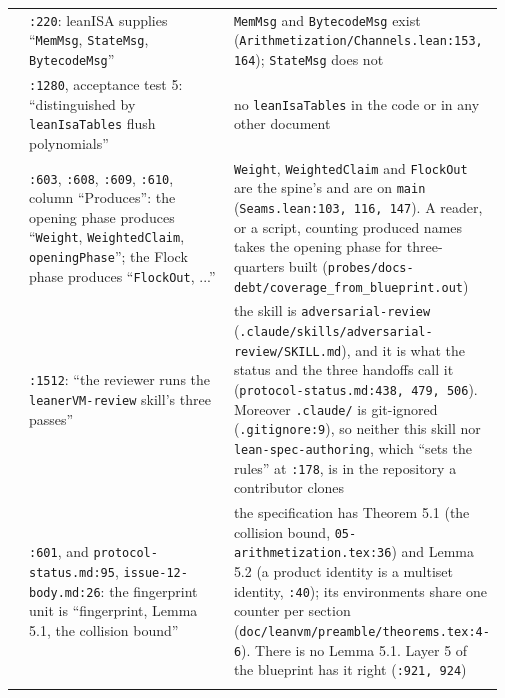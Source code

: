 {\begin{longtable}{@{}>{\raggedright\arraybackslash}p{0.029\linewidth}>{\raggedright\arraybackslash}p{0.470\linewidth}>{\raggedright\arraybackslash}p{0.470\linewidth}@{}}
4 & \texttt{:\allowbreak{}220}: leanISA supplies ``\texttt{MemMsg}, \texttt{StateMsg}, \texttt{BytecodeMsg}'' & \texttt{MemMsg} and \texttt{BytecodeMsg} exist (\texttt{Arithmetization/\allowbreak{}Channels.\allowbreak{}lean:\allowbreak{}153,\allowbreak{} 164}); \texttt{StateMsg} does not \\\addlinespace[2pt]
5 & \texttt{:\allowbreak{}1280}, acceptance test 5: ``distinguished by \texttt{leanIsaTables} flush polynomials'' & no \texttt{leanIsaTables} in the code or in any other document \\\addlinespace[2pt]
6 & \texttt{:\allowbreak{}603}, \texttt{:\allowbreak{}608}, \texttt{:\allowbreak{}609}, \texttt{:\allowbreak{}610}, column ``Produces'': the opening phase produces ``\texttt{Weight}, \texttt{WeightedClaim}, \texttt{openingPhase}''; the Flock phase produces ``\texttt{FlockOut}, ...'' & \texttt{Weight}, \texttt{WeightedClaim} and \texttt{FlockOut} are the spine's and are on \texttt{main} (\texttt{Seams.\allowbreak{}lean:\allowbreak{}103,\allowbreak{} 116,\allowbreak{} 147}). A reader, or a script, counting produced names takes the opening phase for three-quarters built (\texttt{probes/\allowbreak{}docs-\allowbreak{}debt/\allowbreak{}coverage\_\allowbreak{}from\_\allowbreak{}blueprint.\allowbreak{}out}) \\\addlinespace[2pt]
7 & \texttt{:\allowbreak{}1512}: ``the reviewer runs the \texttt{leaner\allowbreak{}VM-\allowbreak{}review} skill's three passes'' & the skill is \texttt{adversarial-\allowbreak{}review} (\texttt{.\allowbreak{}claude/\allowbreak{}skills/\allowbreak{}adversarial-\allowbreak{}review/\allowbreak{}SKILL.\allowbreak{}md}), and it is what the status and the three handoffs call it (\texttt{protocol-\allowbreak{}status.\allowbreak{}md:\allowbreak{}438,\allowbreak{} 479,\allowbreak{} 506}). Moreover \texttt{.\allowbreak{}claude/\allowbreak{}} is git-ignored (\texttt{.\allowbreak{}gitignore:\allowbreak{}9}), so neither this skill nor \texttt{lean-\allowbreak{}spec-\allowbreak{}authoring}, which ``sets the rules'' at \texttt{:\allowbreak{}178}, is in the repository a contributor clones \\\addlinespace[2pt]
8 & \texttt{:\allowbreak{}601}, and \texttt{protocol-\allowbreak{}status.\allowbreak{}md:\allowbreak{}95}, \texttt{issue-\allowbreak{}12-\allowbreak{}body.\allowbreak{}md:\allowbreak{}26}: the fingerprint unit is ``fingerprint, Lemma 5.1, the collision bound'' & the specification has Theorem 5.1 (the collision bound, \texttt{05-\allowbreak{}arithmetization.\allowbreak{}tex:\allowbreak{}36}) and Lemma 5.2 (a product identity is a multiset identity, \texttt{:\allowbreak{}40}); its environments share one counter per section (\texttt{doc/\allowbreak{}leanvm/\allowbreak{}preamble/\allowbreak{}theorems.\allowbreak{}tex:\allowbreak{}4-\allowbreak{}6}). There is no Lemma 5.1. Layer 5 of the blueprint has it right (\texttt{:\allowbreak{}921,\allowbreak{} 924}) \\\addlinespace[2pt]

\end{longtable}}
